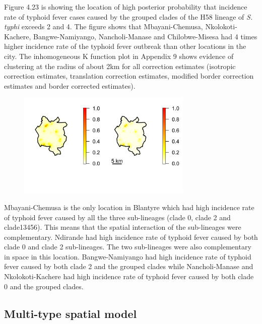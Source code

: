 \documentclass[12pt,a4paper]{report}
\begin{document}
Figure 4.23 is showing the location of high posterior probability that incidence rate of typhoid fever cases caused by the grouped clades of the H58 lineage of \textit{S. typhi} exceeds 2 and 4. The figure shows that Mbayani-Chemusa, Nkolokoti-Kachere, Bangwe-Namiyango, Nancholi-Manase and Chilobwe-Misesa had 4 times higher incidence rate of the typhoid fever outbreak than other locations in the city. The inhomogeneous K function plot in Appendix 9 shows evidence of clustering at the radius of about 2km for all correction estimates (isotropic correction estimates, translation correction estimates, modified border correction estimates and border corrected estimates).\\

\begin{figure}[H]
\begin{center}
\includegraphics[width = \linewidth, height = 50mm]{Exceedance Probabilities - Major 13456.png}
\end{center}
\end{figure}

Mbayani-Chemusa is the only location in Blantyre which had high incidence rate of typhoid fever caused by all the three sub-lineages (clade 0, clade 2 and clade13456). This means that the spatial interaction of the sub-lineages were complementary. Ndirande had high incidence rate of typhoid fever caused by both clade 0 and clade 2 sub-lineages. The two sub-lineages were also complementary in space in this location. Bangwe-Namiyango had high incidence rate of typhoid fever caused by both clade 2 and the grouped clades while Nancholi-Manase and Nkolokoti-Kachere had high incidence rate of typhoid fever caused by both clade 0 and the grouped clades.

\subsection{Multi-type spatial model}
\end{document}
